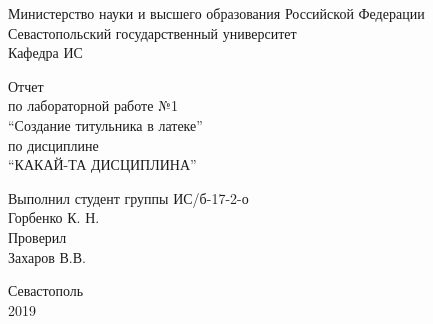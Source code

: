 \documentclass[a4paper,14pt]{extarticle}
\newcommand{\mylabnumber}{1}
\newcommand{\mylabtitle}{Создание титульника в латеке}
\newcommand{\mysubject}{Какай-та дисциплина}
\newcommand{\mylecturer}{Захаров В.В.}
\begin{document}
    \lstset{ %
        basicstyle=\footnotesize\ttfamily,
        breaklines=true,
        numbersep=5pt,
        tabsize=4,
        gobble=8,
        extendedchars=\true,
        keepspaces=\true,
        numbers=left,
        stringstyle=\ttfamily,
        showstringspaces=\false
    }


    \begin{titlepage}
        
        \thispagestyle{empty}
        
        \begin{center}
            
            Министерство науки и высшего образования Российской Федерации \\
            Севастопольский государственный университет \\
            Кафедра ИС
            
            \vfill

            Отчет \\
            по лабораторной работе №\mylabnumber \\
            \enquote{\mylabtitle} \\
            по дисциплине \\
            \enquote{\MakeTextUppercase{\mysubject}}

        \end{center}

        \vspace{1cm}

        \noindent\hspace{7.5cm} Выполнил студент группы ИС/б-17-2-о \\
        \null\hspace{7.5cm} Горбенко К. Н. \\
        \null\hspace{7.5cm} Проверил \\
        \null\hspace{7.5cm} \mylecturer

        \vfill

        \begin{center}
            Севастополь \\
            2019
        \end{center}

    \end{titlepage}
\end{document}
